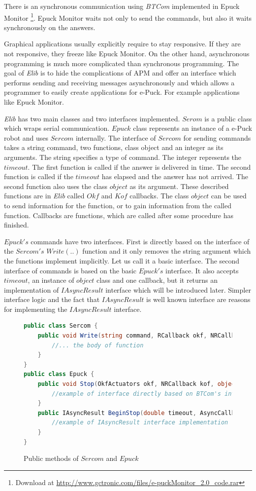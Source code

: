 \documentclass[12pt,notitlepage]{report}
\begin{document}
	There is an synchronous communication using {\it BTCom} implemented in Epuck Monitor
	\footnote{\small{Download at \url{http://www.gctronic.com/files/e-puckMonitor_2.0_code.rar}}}. 
	Epuck Monitor waits not only to send the commands, but also it waits synchronously on the answers.
	 
	Graphical applications usually explicitly require to stay responsive. 
	If they are not responsive, they freeze like Epuck Monitor.
	On the other hand, asynchronous programming is much more complicated than synchronous programming.
	The goal of {\it Elib} is to hide the complications of APM and offer an interface
	which performs sending and receiving messages asynchronously and
	which allows a programmer to easily create applications for e-Puck. For example applications like Epuck Monitor.
	 
	{\it Elib} has two main classes and two interfaces implemented.
	$Serom$ is a public class which wraps serial communication.
	$Epuck$ class represents an instance of a e-Puck robot and uses $Sercom$ internally.
	The interface of $Sercom$ for sending commands takes a
	string command, two functions, class object and an integer as its arguments.
	The string specifies a type of command. The integer represents the $timeout$.
	The first function is called if the answer is delivered in time.
	The second function is called if the $timeout$ has elapsed and the answer has not arrived.
	The second function also uses the class $object$ as its argument.  These described
	functions are in {\it Elib} called $Okf$ and $Kof$ callbacks. The class $object$
	can be used to send information for the function, or to gain information from the called function.
	Callbacks are functions, which are called after some procedure has finished.

	$Epuck's$ commands have two interfaces. First is directly based on the interface of 
	the $Sercom's$ $Write(..)$ function and it only removes the string argument which the functions
	implement implicitly.
	Let us call it a basic interface.
	The second interface of commands is based on the basic $Epuck's$ interface. 
	It also accepts $timeout$, an instance of $object$ class and one callback, but it returns 
	an implementation of $IAsyncResult$ interface which will be introduced later.
	Simpler interface logic	and the fact that $IAsyncResult$ is well known interface
	are reasons for implementing the $IAsyncResult$ interface.

\begin{figure}[!hbp]
\begin{lstlisting}[language=cs]
public class Sercom {
	public void Write(string command, RCallback okf, NRCallback kof,object state, double timeout) {
		//... the body of function
	}
}
public class Epuck {
	public void Stop(OkfActuators okf, NRCallback kof, object state, double timeout) {
		//example of interface directly based on BTCom's interface
	}
	public IAsyncResult BeginStop(double timeout, AsyncCallback callback, Object state) {
		//example of IAsyncResult interface implementation
	}
}
\end{lstlisting}
\caption{Public methods of $Sercom$ and $Epuck$} \label{serep}
\end{figure}
\end{document}
